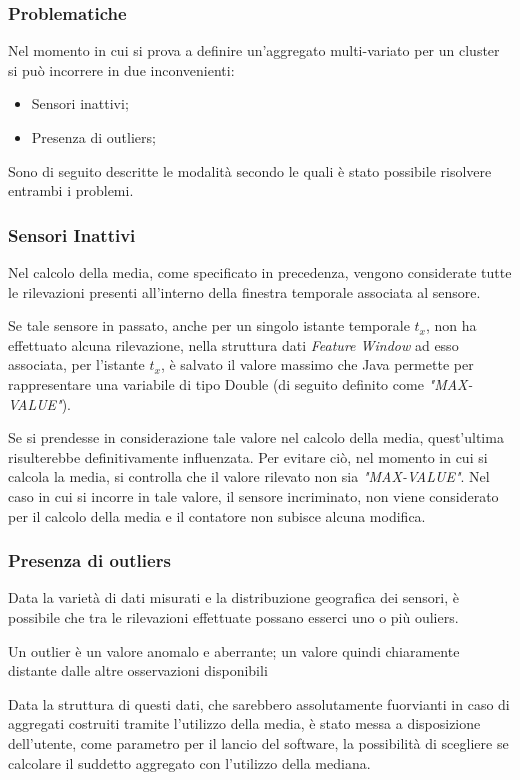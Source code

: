 \documentclass[12pt,a4paper,twoside,openright]{book}
\begin{document}
\subsubsection{Problematiche}
Nel momento in cui si prova a definire un'aggregato multi-variato per un cluster si può incorrere in due inconvenienti:
\begin{itemize}
\item Sensori inattivi;
\item Presenza di outliers;
\end{itemize}
Sono di seguito descritte le modalità secondo le quali è stato possibile risolvere entrambi i problemi.
\subsubsection{Sensori Inattivi}
Nel calcolo della media, come specificato in precedenza, vengono considerate tutte le rilevazioni presenti all'interno della finestra temporale associata al sensore. 

Se tale sensore in passato, anche per un singolo istante temporale \textit{$t_{x}$}, non ha effettuato alcuna rilevazione, nella struttura dati \textit{Feature Window} ad esso associata, per l'istante \textit{$t_{x}$}, è salvato il valore massimo che Java permette per rappresentare una variabile di tipo Double (di seguito definito come \textit{"MAX-VALUE"}).


Se si prendesse in considerazione tale valore nel calcolo della media, quest'ultima risulterebbe definitivamente influenzata. Per evitare ciò, nel momento in cui si calcola la media, si controlla che il valore rilevato non sia \textit{"MAX-VALUE"}.
Nel caso in cui si incorre in tale valore, il sensore incriminato, non viene considerato per il calcolo della media e il contatore non subisce alcuna modifica.
 
\subsubsection{Presenza di outliers}
Data la varietà di dati misurati e la distribuzione geografica dei sensori, è possibile che tra le rilevazioni effettuate possano esserci uno o più ouliers. 

Un outlier è un valore anomalo e aberrante; un valore quindi chiaramente distante dalle altre osservazioni disponibili \cite{14a} 

Data la struttura di questi dati, che sarebbero assolutamente fuorvianti in caso di aggregati costruiti tramite l'utilizzo della media, è stato messa a disposizione dell'utente, come parametro per il lancio del software, la possibilità di scegliere se calcolare il suddetto aggregato con l'utilizzo della mediana.
\end{document}
